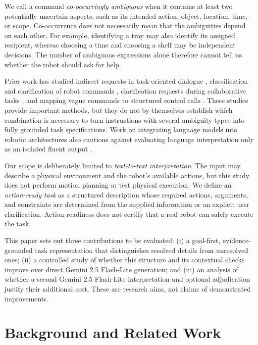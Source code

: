 \documentclass[10pt,conference]{IEEEtran}
\begin{document}
We call a command \emph{co-occurringly ambiguous} when it contains at least two potentially uncertain aspects, such as its intended action, object, location, time, or scope. Co-occurrence does not necessarily mean that the ambiguities depend on each other. For example, identifying a tray may also identify its assigned recipient, whereas choosing a time and choosing a shelf may be independent decisions. The number of ambiguous expressions alone therefore cannot tell us whether the robot should ask for help.

Prior work has studied indirect requests in task-oriented dialogue \cite{mannekote}, classification and clarification of robot commands \cite{clara}, clarification requests during collaborative tasks \cite{codraw}, and mapping vague commands to structured control calls \cite{clarifyvc}. These studies provide important methods, but they do not by themselves establish which combination is necessary to turn instructions with several ambiguity types into fully grounded task specifications. Work on integrating language models into robotic architectures also cautions against evaluating language interpretation only as an isolated fluent output \cite{sarathy}.

Our scope is deliberately limited to \emph{text-to-text interpretation}. The input may describe a physical environment and the robot's available actions, but this study does not perform motion planning or test physical execution. We define an \emph{action-ready task} as a structured description whose required actions, arguments, and constraints are determined from the supplied information or an explicit user clarification. Action readiness does not certify that a real robot can safely execute the task.

This paper sets out three contributions to be evaluated: (i) a goal-first, evidence-grounded task representation that distinguishes resolved details from unresolved ones; (ii) a controlled study of whether this structure and its contextual checks improve over direct Gemini 2.5 Flash-Lite generation; and (iii) an analysis of whether a second Gemini 2.5 Flash-Lite interpretation and optional adjudication justify their additional cost. These are research aims, not claims of demonstrated improvements.

\section{Background and Related Work}
\end{document}
